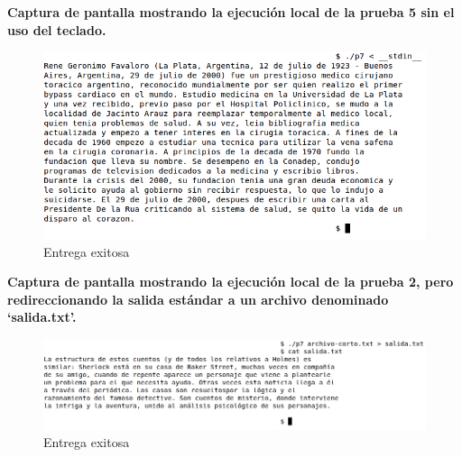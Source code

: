 \documentclass{article}
\begin{document}
\textbf{Captura de pantalla mostrando la ejecución local de la prueba 5 sin el uso del teclado.}
    \begin{figure}[H]
        \includegraphics[width=\columnwidth]{p7_5}
        \caption{Entrega exitosa}
    \end{figure}
\textbf{Captura de pantalla mostrando la ejecución local de la prueba 2, pero redireccionando la salida
estándar a un archivo denominado ‘salida.txt’.}
    \begin{figure}[H]
        \includegraphics[width=\columnwidth]{p7_2}
        \caption{Entrega exitosa}
    \end{figure}
\end{document}
